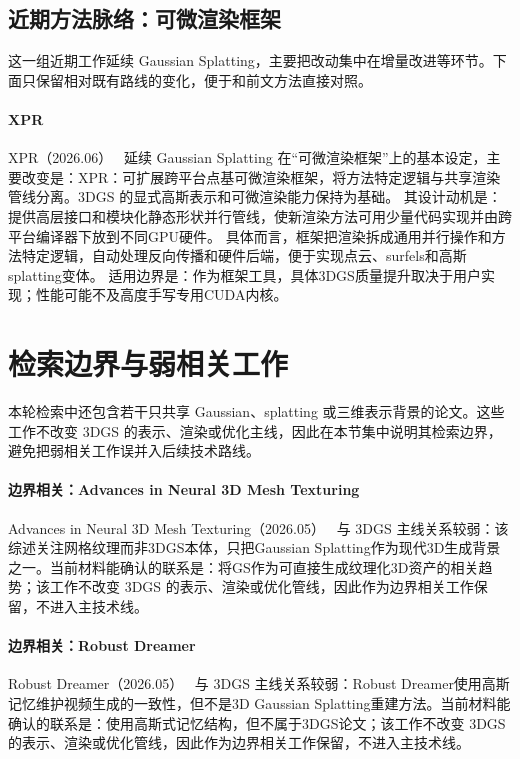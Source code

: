 
\subsection{近期方法脉络：可微渲染框架}

这一组近期工作延续 Gaussian Splatting，主要把改动集中在增量改进等环节。下面只保留相对既有路线的变化，便于和前文方法直接对照。

\paragraph{XPR}
XPR（2026.06）~\cite{2606_11529} 延续 Gaussian Splatting 在“可微渲染框架”上的基本设定，主要改变是：XPR：可扩展跨平台点基可微渲染框架，将方法特定逻辑与共享渲染管线分离。3DGS 的显式高斯表示和可微渲染能力保持为基础。
其设计动机是：提供高层接口和模块化静态形状并行管线，使新渲染方法可用少量代码实现并由跨平台编译器下放到不同GPU硬件。
具体而言，框架把渲染拆成通用并行操作和方法特定逻辑，自动处理反向传播和硬件后端，便于实现点云、surfels和高斯splatting变体。
适用边界是：作为框架工具，具体3DGS质量提升取决于用户实现；性能可能不及高度手写专用CUDA内核。

\section{检索边界与弱相关工作}

本轮检索中还包含若干只共享 Gaussian、splatting 或三维表示背景的论文。这些工作不改变 3DGS 的表示、渲染或优化主线，因此在本节集中说明其检索边界，避免把弱相关工作误并入后续技术路线。

\paragraph{边界相关：Advances in Neural 3D Mesh Texturing}
Advances in Neural 3D Mesh Texturing（2026.05）~\cite{2606_00137} 与 3DGS 主线关系较弱：该综述关注网格纹理而非3DGS本体，只把Gaussian Splatting作为现代3D生成背景之一。当前材料能确认的联系是：将GS作为可直接生成纹理化3D资产的相关趋势；该工作不改变 3DGS 的表示、渲染或优化管线，因此作为边界相关工作保留，不进入主技术线。

\paragraph{边界相关：Robust Dreamer}
Robust Dreamer（2026.05）~\cite{2605_30855} 与 3DGS 主线关系较弱：Robust Dreamer使用高斯记忆维护视频生成的一致性，但不是3D Gaussian Splatting重建方法。当前材料能确认的联系是：使用高斯式记忆结构，但不属于3DGS论文；该工作不改变 3DGS 的表示、渲染或优化管线，因此作为边界相关工作保留，不进入主技术线。

